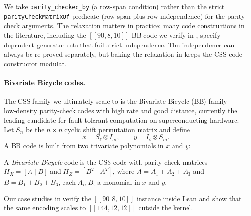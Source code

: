 We take \lstinline{parity_checked_by} (a row-span condition) rather than the
strict \lstinline{parityCheckMatrixOf} predicate (row-span plus
row-independence) for the parity-check arguments. The relaxation matters in
practice: many code constructions in the literature, including the $[[90, 8,
10]]$ BB code we verify in , specify dependent generator
sets that fail strict independence. The independence can always be re-proved
separately, but baking the relaxation in keeps the CSS-code constructor modular.

\paragraph{Bivariate Bicycle codes.} The CSS family we ultimately scale to is
the Bivariate Bicycle (BB) family --- low-density parity-check codes with high
rate and good distance, currently the leading candidate for fault-tolerant
computation on superconducting hardware. Let $S_n$ be the $n \times n$ cyclic
shift permutation matrix and define
$$x = S_\ell \otimes I_m, \qquad y = I_\ell \otimes S_m.$$
A BB code is built from two trivariate polynomials in $x$ and $y$:
\begin{definition}
    A \emph{Bivariate Bicycle} code is the CSS code with parity-check matrices
    $H_X = [A \mid B]$ and $H_Z = [B^T \mid A^T]$, where $A = A_1 + A_2 + A_3$
    and $B = B_1 + B_2 + B_3$, each $A_i, B_i$ a monomial in $x$ and $y$.
\end{definition}
Our case studies in  verify the $[[90, 8, 10]]$ instance
inside Lean and show that the same encoding scales to $[[144, 12, 12]]$ outside
the kernel.

